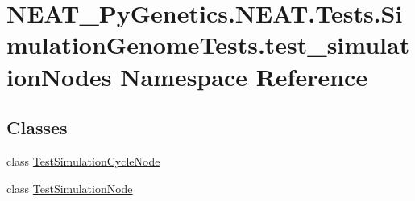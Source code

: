 \hypertarget{namespaceNEAT__PyGenetics_1_1NEAT_1_1Tests_1_1SimulationGenomeTests_1_1test__simulationNodes}{}\section{N\+E\+A\+T\+\_\+\+Py\+Genetics.\+N\+E\+A\+T.\+Tests.\+Simulation\+Genome\+Tests.\+test\+\_\+simulation\+Nodes Namespace Reference}
\label{namespaceNEAT__PyGenetics_1_1NEAT_1_1Tests_1_1SimulationGenomeTests_1_1test__simulationNodes}
\subsection*{Classes}
\begin{DoxyCompactItemize}
\item 
class \hyperlink{classNEAT__PyGenetics_1_1NEAT_1_1Tests_1_1SimulationGenomeTests_1_1test__simulationNodes_1_1TestSimulationCycleNode}{Test\+Simulation\+Cycle\+Node}
\item 
class \hyperlink{classNEAT__PyGenetics_1_1NEAT_1_1Tests_1_1SimulationGenomeTests_1_1test__simulationNodes_1_1TestSimulationNode}{Test\+Simulation\+Node}
\end{DoxyCompactItemize}
